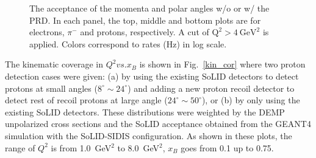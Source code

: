 \begin{figure}[!ht]
 \begin{center}
   \caption[The acceptance of the momenta and scattering angles for electrons,
     $\pi^{-}$ and protons]{\footnotesize{The acceptance of the momenta and
       polar angles w/o or w/ the PRD. In each panel, the top, middle and
       bottom plots are for electrons, $\pi^{-}$ and protons, respectively. A
       cut of $\mathrm{Q^{2}>4~GeV^{2}}$ is applied. Colors correspond to rates
       (Hz) in log scale.}}
  \label{p_theta}
  \end{center}
\end{figure}
The kinematic coverage in $Q^{2} vs. x_{B}$ is shown in Fig.~\ref{kin_cor}
where two proton detection cases were given: (a) by using the existing SoLID
detectors to detect protons at small angles ($8^{\circ}\sim24^{\circ}$) and
adding a new proton recoil detector to detect rest of recoil protons at large
angle ($24^{\circ}\sim50^{\circ}$), or (b) by only using the existing SoLID
detectors. These distributions were weighted by the DEMP unpolarized cross sections and the
SoLID acceptance obtained from the GEANT4 simulation with the SoLID-SIDIS
configuration. As shown in these plots, the range of $Q^{2}$ is from
1.0~GeV$^{2}$ to 8.0~GeV$^{2}$, $x_{B}$ goes from 0.1 up to 0.75.

